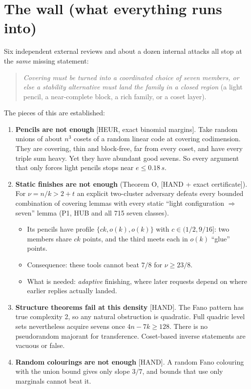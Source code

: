 \documentclass[11pt]{article}
\newcommand{\st}[1]{\textsf{\small[#1]}}
\begin{document}
\section{The wall (what everything runs into)}
Six independent external reviews and about a dozen internal attacks all stop at the \emph{same} missing statement:
\begin{quote}
\emph{Covering must be turned into a coordinated choice of seven members, or else a stability alternative must land the
family in a closed region} (a light pencil, a near-complete block, a rich family, or a coset layer).
\end{quote}
The pieces of this are established:
\begin{enumerate}
\item \textbf{Pencils are not enough} \st{HEUR, exact binomial margins}. Take random unions of about $n^3$ cosets of a random
linear code at covering codimension. They are covering, thin and block-free, far from every coset, and have every triple
sum heavy. Yet they have abundant good sevens. So every argument that only forces light pencils stops near
$e\le0.18\,s$.
\item \textbf{Static finishes are not enough} (Theorem O, \st{HAND + exact certificate}). For $\nu=n/k>2+t$ an explicit
two-cluster adversary defeats every bounded combination of covering lemmas with every static ``light configuration
$\Rightarrow$ seven'' lemma (P1, HUB and all 715 seven classes).
\begin{itemize}
\item Its pencils have profile $\{ck,o(k),o(k)\}$ with $c\in(1/2,9/16]$: two members share $ck$ points, and the third meets each in $o(k)$ ``glue'' points.
\item Consequence: these tools cannot beat $7/8$ for $\nu\ge23/8$.
\item What is needed: \emph{adaptive} finishing, where later requests depend on where earlier replies actually landed.
\end{itemize}
\item \textbf{Structure theorems fail at this density} \st{HAND}. The Fano pattern has true complexity 2, so any natural
obstruction is quadratic. Full quadric level sets nevertheless acquire sevens once $4n-7k\ge128$. There is no pseudorandom
majorant for transference. Coset-based inverse statements are vacuous or false.
\item \textbf{Random colourings are not enough} \st{HAND}. A random Fano colouring with the union bound gives only slope
$3/7$, and bounds that use only marginals cannot beat it.
\end{enumerate}
\end{document}
